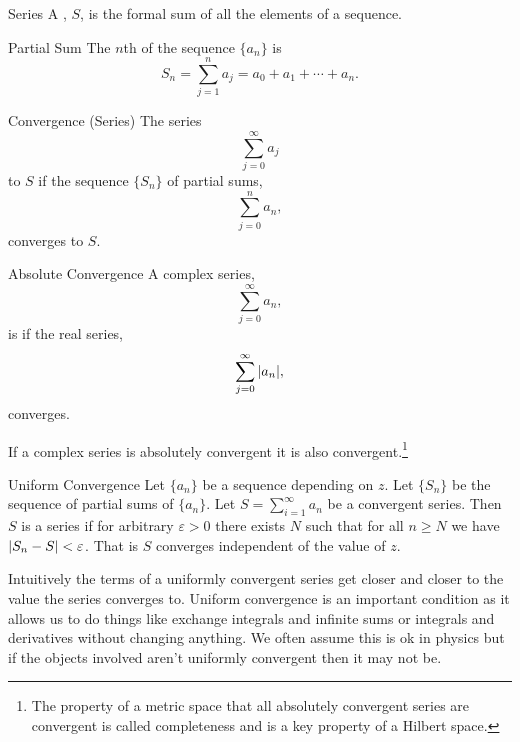 \documentclass{article}
\begin{document}
    \begin{definition}{Series}{}
        A , \(S\), is the formal sum of all the elements of a sequence.
    \end{definition}
    \begin{definition}{Partial Sum}{}
        The \(n\)th  of the sequence \(\{a_n\}\) is
        \[S_n = \sum_{j=1}^{n} a_j = a_0 + a_1 + \dotsb + a_n.\]
    \end{definition}
    \begin{definition}{Convergence (Series)}{}
        The series
        \[\sum_{j=0}^{\infty} a_j\]
         to \(S\) if the sequence \(\{S_n\}\) of partial sums,
        \[\sum_{j=0}^{n} a_n,\]
        converges to \(S\).
    \end{definition}
    \begin{definition}{Absolute Convergence}{}
        A complex series,
        \[\sum_{j=0}^{\infty} a_n,\]
        is  if the real series,
        \[\sum_{j=0}^{\infty} \abs{a_n},\]
        converges.
    \end{definition}
    If a complex series is absolutely convergent it is also convergent.\footnote{The property of a metric space that all absolutely convergent series are convergent is called completeness and is a key property of a Hilbert space.}
    \begin{definition}{Uniform Convergence}{}
        Let \(\{a_n\}\) be a sequence depending on \(z\).
        Let \(\{S_n\}\) be the sequence of partial sums of \(\{a_n\}\).
        Let \(S = \sum_{i=1}^{\infty} a_n\) be a convergent series.
        Then \(S\) is a  series if for arbitrary \(\varepsilon > 0\) there exists \(N\) such that for all \(n \ge N\) we have \(\abs{S_n - S} < \varepsilon\).
        That is \(S\) converges independent of the value of \(z\).
    \end{definition}
    Intuitively the terms of a uniformly convergent series get closer and closer to the value the series converges to.
    Uniform convergence is an important condition as it allows us to do things like exchange integrals and infinite sums or integrals and derivatives without changing anything.
    We often assume this is ok in physics but if the objects involved aren't uniformly convergent then it may not be.
    
\end{document}
